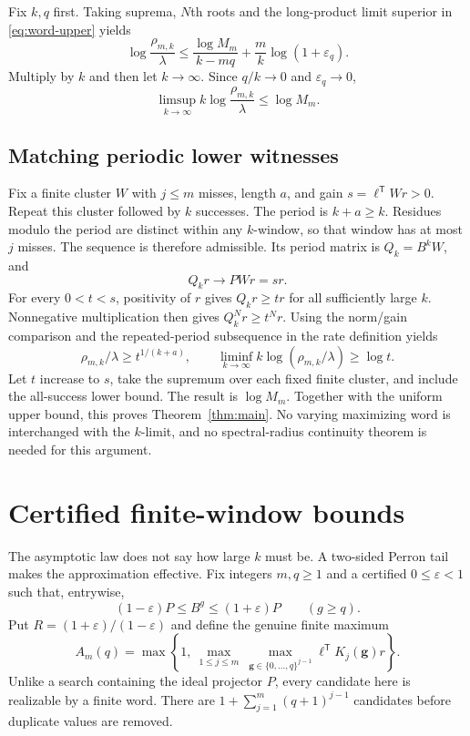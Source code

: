 \documentclass[11pt,letterpaper]{article}
\theoremstyle{remark}
\newcommand{\transpose}{^{\mathsf T}}
\begin{document}
Fix $k,q$ first. Taking suprema, $N$th roots and the long-product
limit superior in \eqref{eq:word-upper} yields
\begin{equation}\label{eq:rate-upper}
 \log\frac{\rho_{m,k}}{\lambda}
 \le\frac{\log M_m}{k-mq}+\frac{m}{k}\log(1+\varepsilon_q).
\end{equation}
Multiply by $k$ and then let $k\to\infty$. Since $q/k\to0$ and
$\varepsilon_q\to0$,
\begin{equation}\label{eq:upper-limit}
 \limsup_{k\to\infty}k\log\frac{\rho_{m,k}}{\lambda}
 \le\log M_m.
\end{equation}

\subsection{Matching periodic lower witnesses}

Fix a finite cluster $W$ with $j\le m$ misses, length $a$, and gain
$s=\ell\transpose Wr>0$. Repeat this cluster followed by $k$ successes.
The period is $k+a\ge k$. Residues modulo the period are distinct within
any $k$-window, so that window has at most $j$ misses. The sequence is
therefore admissible. Its period matrix is $Q_k=B^kW$, and
\[
 Q_kr\longrightarrow PWr=sr.
\]
For every $0<t<s$, positivity of $r$ gives $Q_kr\ge tr$ for all sufficiently
large $k$. Nonnegative multiplication then gives $Q_k^Nr\ge t^Nr$.
Using the norm/gain comparison and the repeated-period subsequence in the
rate definition yields
\[
 \rho_{m,k}/\lambda\ge t^{1/(k+a)},\qquad
 \liminf_{k\to\infty}k\log(\rho_{m,k}/\lambda)\ge\log t.
\]
Let $t$ increase to $s$, take the supremum over each fixed finite cluster,
and include the all-success lower bound. The result is $\log M_m$.
Together with the uniform upper bound, this proves Theorem~\ref{thm:main}.
No varying maximizing word is interchanged with the $k$-limit, and no
spectral-radius continuity theorem is needed for this argument.

\section{Certified finite-window bounds}\label{sec:quant}

The asymptotic law does not say how large $k$ must be. A two-sided Perron
tail makes the approximation effective. Fix integers $m,q\ge1$ and a
certified $0\le\varepsilon<1$ such that, entrywise,
\begin{equation}\label{eq:two-tail}
 (1-\varepsilon)P\le B^g\le(1+\varepsilon)P\qquad(g\ge q).
\end{equation}
Put $R=(1+\varepsilon)/(1-\varepsilon)$ and define the genuine finite maximum
\begin{equation}\label{eq:cutoff}
 A_m(q)=\max\left\{1,\ \max_{1\le j\le m}\
   \max_{\boldsymbol g\in\{0,\ldots,q\}^{j-1}}
       \ell\transpose K_j(\boldsymbol g)r\right\}.
\end{equation}
Unlike a search containing the ideal projector $P$, every candidate here
is realizable by a finite word. There are
$1+\sum_{j=1}^m(q+1)^{j-1}$ candidates before duplicate values are removed.
\end{document}
